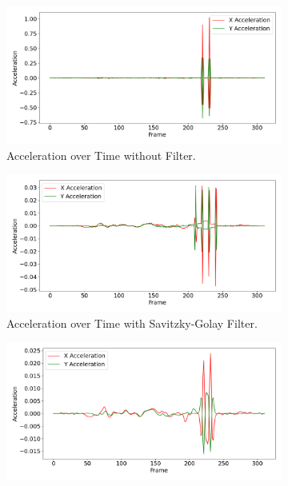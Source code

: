 \documentclass[12pt,oneside]{book} %
\begin{document}
\begin{figure}[H]
    \centering
    \begin{subfigure}[t]{0.65\textwidth}
        \includegraphics[width=\textwidth]{figures/bbox_metrics/test_indoor1 (Raw Data)_acceleration.png}
        \caption{Acceleration over Time without Filter.}
        \label{fig:acceleration-test-indoor1-raw}
    \end{subfigure}
    \hfill
    \begin{subfigure}[t]{0.65\textwidth}
        \includegraphics[width=\textwidth]{figures/bbox_metrics/test_indoor1 (Savgol Filter)_acceleration.png}
        \caption{Acceleration over Time with Savitzky-Golay Filter.}
        \label{fig:acceleration-test-indoor1-savgol}
    \end{subfigure}
    \vfill
    \begin{subfigure}[t]{0.65\textwidth}
        \includegraphics[width=\textwidth]{figures/bbox_metrics/test_indoor1 (Gaussian Filter)_acceleration.png}

\end{subfigure}
\end{figure}
\end{document}
